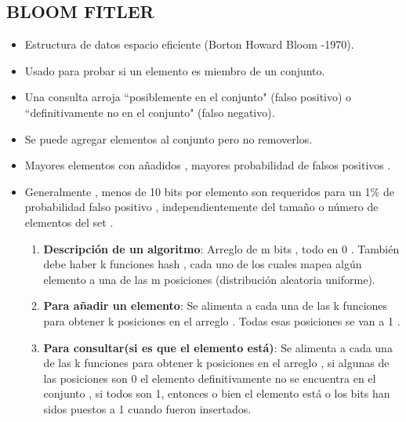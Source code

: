\documentclass[journal]{IEEEtran}
\begin{document}
\subsection{BLOOM FITLER}
\begin{itemize}
    \item Estructura de datos espacio eficiente (Borton Howard Bloom -1970).
    \item Usado para probar si un elemento es miembro de un conjunto.
    \item Una consulta arroja ``posiblemente en el conjunto" (falso positivo)  o ``definitivamente no en el conjunto" (falso negativo).
    \item Se puede agregar elementos al conjunto pero no removerlos.
    \item Mayores elementos con añadidos , mayores probabilidad de falsos positivos .
    \item Generalmente , menos de 10 bits por elemento son requeridos para un 1\% de probabilidad falso positivo , independientemente del tamaño o número de elementos del set .
    \begin{enumerate}
    \item {\bf Descripción de un algoritmo}: Arreglo de m bits , todo en 0 . También debe haber k funciones hash , cada uno de los cuales mapea algún elemento a una de las m posiciones (distribución aleatoria uniforme). 
    \item {\bf Para añadir un elemento}: Se alimenta a cada una de las k funciones para obtener k posiciones en el arreglo . Todas esas posiciones se van a 1 .
    \item {\bf Para consultar(si es que el elemento está)}: Se alimenta a cada una de las k funciones para obtener k posiciones en el arreglo , si algunas de las posiciones son 0 el elemento definitivamente no se encuentra en el conjunto , si todos son 1, entonces o bien el elemento está o los bits han sidos puestos a 1 cuando fueron insertados.
\end{enumerate}

\end{itemize}
\end{document}
